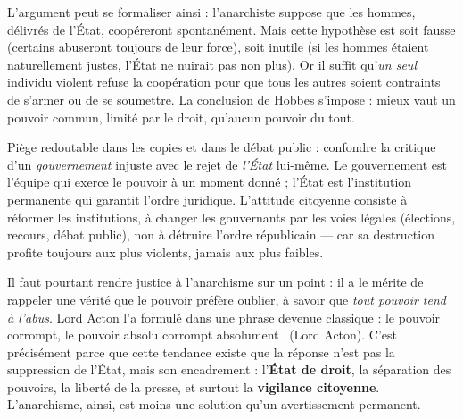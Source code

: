 \documentclass[11pt]{article}
\begin{document}
L'argument peut se formaliser ainsi : l'anarchiste suppose que les hommes, délivrés de l'État, coopéreront spontanément. Mais cette hypothèse est soit fausse (certains abuseront toujours de leur force), soit inutile (si les hommes étaient naturellement justes, l'État ne nuirait pas non plus). Or il suffit qu'\emph{un seul} individu violent refuse la coopération pour que tous les autres soient contraints de s'armer ou de se soumettre. La conclusion de Hobbes s'impose : mieux vaut un pouvoir commun, limité par le droit, qu'aucun pouvoir du tout.

\begin{attention}
Piège redoutable dans les copies et dans le débat public : confondre la critique d'un \emph{gouvernement} injuste avec le rejet de \emph{l'État} lui-même. Le gouvernement est l'équipe qui exerce le pouvoir à un moment donné ; l'État est l'institution permanente qui garantit l'ordre juridique. L'attitude citoyenne consiste à réformer les institutions, à changer les gouvernants par les voies légales (élections, recours, débat public), non à détruire l'ordre républicain — car sa destruction profite toujours aux plus violents, jamais aux plus faibles.
\end{attention}

Il faut pourtant rendre justice à l'anarchisme sur un point : il a le mérite de rappeler une vérité que le pouvoir préfère oublier, à savoir que \emph{tout pouvoir tend à l'abus}. Lord Acton l'a formulé dans une phrase devenue classique : \guillemotleft le pouvoir corrompt, le pouvoir absolu corrompt absolument \guillemotright\ (Lord Acton). C'est précisément parce que cette tendance existe que la réponse n'est pas la suppression de l'État, mais son encadrement : l'\textbf{État de droit}, la séparation des pouvoirs, la liberté de la presse, et surtout la \textbf{vigilance citoyenne}. L'anarchisme, ainsi, est moins une solution qu'un avertissement permanent.
\end{document}
